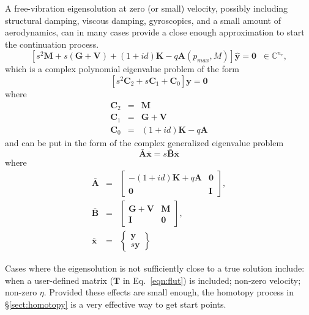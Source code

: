 \documentclass[11pt,openany,twoside]{book}
\numberwithin{equation}{section}		%
\newcommand{\Matrix}[1]{\boldsymbol{#1}}
\newcommand{\Vector}[1]{\boldsymbol{#1}}
\newcommand{\Sectref}[1]{\S\ref{#1}}
\newcommand{\Eqn}[1]{Eq.\ \ref{#1}}  %
\begin{document}
A free-vibration eigensolution at zero (or small) velocity, possibly
including structural damping, viscous damping, gyroscopics, and a
small amount of aerodynamics, can in many cases provide a close enough
approximation to start the continuation process.
\begin{equation}\label{eqn:free-vib}
\left[ s^2 \Matrix{M} + s \left(\Matrix{G} + \Matrix{V}\right) +
 (1 + id) \Matrix{K} - q \Matrix{A} (p_{max},M) \right]
  \hat{\Vector{y}} = \Vector{0} \; \; \in \mathbb{C}^{n_e},
\end{equation}
which is a complex polynomial eigenvalue problem of the form
\begin{equation}
\left[ s^2 \Matrix{C}_2 + s \Matrix{C}_1 + \Matrix{C}_0 \right] \Vector{y} = \Vector{0}
\end{equation}
where
\begin{eqnarray}
\Matrix{C}_2 &=& \Matrix{M} \nonumber \\
\Matrix{C}_1 &=& \Matrix{G} + \Matrix{V} \nonumber \\
\Matrix{C}_0 &=& (1 + id)\Matrix{K} - q\Matrix{A}
\end{eqnarray}
and can be put in the form of the complex generalized eigenvalue problem
\begin{equation}
\bar{\Matrix{A}}\bar{\Vector{x}} = s \bar{\Matrix{B}}\bar{\Vector{x}}
\end{equation}
where
\begin{eqnarray}
\bar{\Matrix{A}} &=& \left[ \begin{array}{cc}
			-(1+id)\Matrix{K} + q\Matrix{A}  & \Matrix{0} \nonumber \\
	   \Matrix{0}  & \Matrix{I}
		\end{array} \right], \\
\bar{\Matrix{B}} &=& \left[ \begin{array}{cc}
			\Matrix{G} + \Matrix{V}  & \Matrix{M} \nonumber \\
	   \Matrix{I}  & \Matrix{0}
		\end{array} \right], \\
\bar{\Vector{x}} &=& \left\{ \begin{array}{c}
			\Vector{y} \\
	   	s\Vector{y}
		\end{array} \right\}
\end{eqnarray}
\par
Cases where the eigensolution is not sufficiently close to a true solution
include: when a user-defined matrix ($\Matrix{T}$ in \Eqn{eqn:flut}) is
included; non-zero velocity; non-zero $\eta$.
Provided these effects are small enough, the homotopy process in
\Sectref{sect:homotopy} is a very effective way to get start points.
\end{document}
